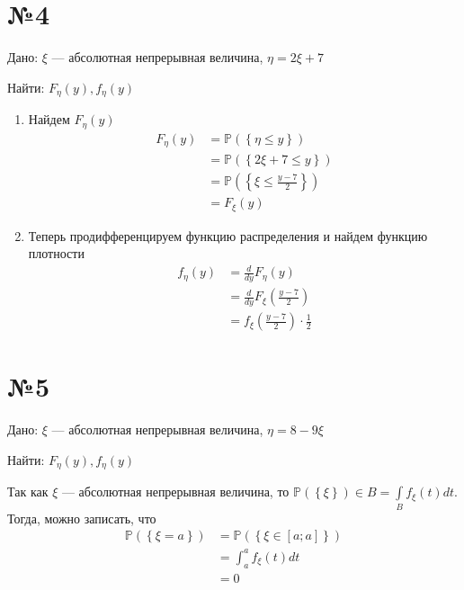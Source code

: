 \documentclass[a4paper, 10pt]{article}
\newcommand{\prob}[1]{\mathbb{P}\left(\left\{#1\right\}\right)}
\begin{document}
\section*{№4}
Дано: $\xi$ — абсолютная непрерывная величина, $\eta=2\xi+7$

Найти: $F_{\eta}(y),f_{\eta}(y)$

\begin{enumerate}
    \item Найдем $F_{\eta}(y)$
    \begin{equation*}
        \begin{aligned}
            F_{\eta}(y)&=\prob{\eta\leqslant y}\\
            &=\prob{2\xi+7\leqslant y}\\
            &=\prob{\xi\leqslant\frac{y-7}{2}}\\
            &=F_{\xi}(y)
        \end{aligned}
    \end{equation*}
    \item Теперь продифференцируем функцию распределения и найдем функцию плотности
    \begin{equation*}
        \begin{aligned}
            f_{\eta}(y)&=\frac{d}{dy}F_{\eta}(y)\\
            &=\frac{d}{dy}F_{\xi}\left(\frac{y-7}{2}\right)\\
            &=f_{\xi}\left(\frac{y-7}{2}\right)\cdot\frac{1}{2}
        \end{aligned}
    \end{equation*}
\end{enumerate}


\section*{№5}
Дано: $\xi$ — абсолютная непрерывная величина, $\eta=8-9\xi$

Найти: $F_{\eta}(y),f_{\eta}(y)$

\comment Так как $\xi$ — абсолютная непрерывная величина, то $\prob\xi\in B=\displaystyle\int\limits_{B}f_{\xi}(t)dt$. Тогда, можно записать, что 
\begin{equation*}
    \begin{aligned}
        \prob{\xi=a}&=\prob{\xi\in[a;a]}\\
        &=\int_a^af_{\xi}(t)dt\\
        &=0
    \end{aligned}
\end{equation*}
\end{document}
